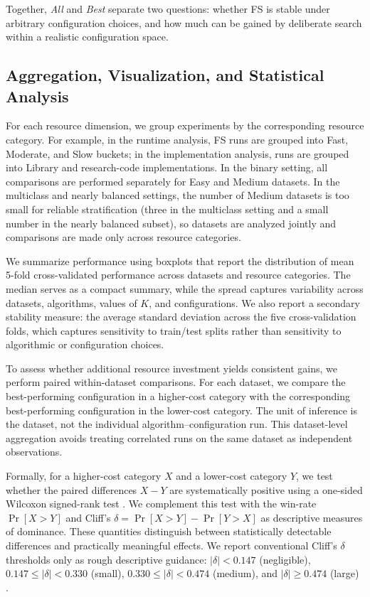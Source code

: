 \documentclass[preprint,12pt,authoryear]{elsarticle}
\begin{document}
{Together, \emph{All} and \emph{Best} separate two questions: whether FS is stable under arbitrary configuration choices, and how much can be gained by deliberate search within a realistic configuration space.

\subsection{Aggregation, Visualization, and Statistical Analysis}\label{sec:statistical_analysis}

For each resource dimension, we group experiments by the corresponding resource category. For example, in the runtime analysis, FS runs are grouped into Fast, Moderate, and Slow buckets; in the implementation analysis, runs are grouped into Library and research-code implementations. In the binary setting, all comparisons are performed separately for Easy and Medium datasets. In the multiclass and nearly balanced settings, the number of Medium datasets is too small for reliable stratification (three in the multiclass setting and a small number in the nearly balanced subset), so datasets are analyzed jointly and comparisons are made only across resource categories.

We summarize performance using boxplots that report the distribution of mean 5-fold cross-validated performance across datasets and resource categories. The median serves as a compact summary, while the spread captures variability across datasets, algorithms, values of $K$, and configurations. We also report a secondary stability measure: the average standard deviation across the five cross-validation folds, which captures sensitivity to train/test splits rather than sensitivity to algorithmic or configuration choices.

To assess whether additional resource investment yields consistent gains, we perform paired within-dataset comparisons. For each dataset, we compare the best-performing configuration in a higher-cost category with the corresponding best-performing configuration in the lower-cost category. The unit of inference is the dataset, not the individual algorithm--configuration run. This dataset-level aggregation avoids treating correlated runs on the same dataset as independent observations.

Formally, for a higher-cost category $X$ and a lower-cost category $Y$, we test whether the paired differences $X-Y$ are systematically positive using a one-sided Wilcoxon signed-rank test \cite{wilcoxon1945individual,demsar2006statistical}. We complement this test with the win-rate $\Pr[X>Y]$ and Cliff's $\delta=\Pr[X>Y]-\Pr[Y>X]$ as descriptive measures of dominance. These quantities distinguish between statistically detectable differences and practically meaningful effects. We report conventional Cliff's $\delta$ thresholds only as rough descriptive guidance: $|\delta| < 0.147$ (negligible), $0.147 \leq |\delta| < 0.330$ (small), $0.330 \leq |\delta| < 0.474$ (medium), and $|\delta| \geq 0.474$ (large) \cite{romano2006appropriate}.

}
\end{document}
